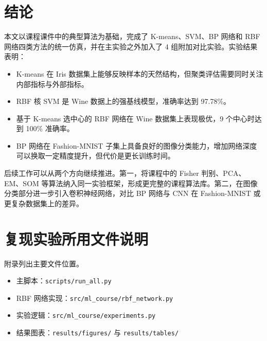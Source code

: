 \documentclass[UTF8]{ctexart}
\begin{document}
\section{结论}
本文以课程课件中的典型算法为基础，完成了 K-means、SVM、BP 网络和 RBF 网络四类方法的统一仿真，并在主实验之外加入了 4 组附加对比实验。实验结果表明：
\begin{itemize}
\item K-means 在 Iris 数据集上能够反映样本的天然结构，但聚类评估需要同时关注内部指标与外部指标。
\item RBF 核 SVM 是 Wine 数据上的强基线模型，准确率达到 97.78\%。
\item 基于 K-means 选中心的 RBF 网络在 Wine 数据集上表现极优，9 个中心时达到 100\% 准确率。
\item BP 网络在 Fashion-MNIST 子集上具备良好的图像分类能力，增加网络深度可以换取一定精度提升，但代价是更长训练时间。
\end{itemize}

后续工作可以从两个方向继续推进。第一，将课程中的 Fisher 判别、PCA、EM、SOM 等算法纳入同一实验框架，形成更完整的课程算法库。第二，在图像分类部分进一步引入卷积神经网络，对比 BP 网络与 CNN 在 Fashion-MNIST 或更复杂数据集上的差异。

\appendix
\section{复现实验所用文件说明}
附录列出主要文件位置。
\begin{itemize}
\item 主脚本：\texttt{scripts/run\_all.py}
\item RBF 网络实现：\texttt{src/ml\_course/rbf\_network.py}
\item 实验逻辑：\texttt{src/ml\_course/experiments.py}
\item 结果图表：\texttt{results/figures/} 与 \texttt{results/tables/}
\end{itemize}
\end{document}

